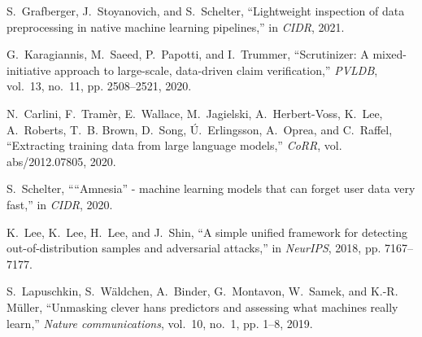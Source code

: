 \documentclass[11pt,dvipsnames]{article}
\begin{document}
\begin{thebibliography}{10}
S.~Grafberger, J.~Stoyanovich, and S.~Schelter, ``Lightweight inspection of
  data preprocessing in native machine learning pipelines,'' in \emph{CIDR},
  2021.

G.~Karagiannis, M.~Saeed, P.~Papotti, and I.~Trummer, ``Scrutinizer: {A}
  mixed-initiative approach to large-scale, data-driven claim verification,''
  \emph{PVLDB}, vol.~13, no.~11, pp. 2508--2521, 2020.

N.~Carlini, F.~Tram{\`{e}}r, E.~Wallace, M.~Jagielski, A.~Herbert{-}Voss,
  K.~Lee, A.~Roberts, T.~B. Brown, D.~Song, {\'{U}}.~Erlingsson, A.~Oprea, and
  C.~Raffel, ``Extracting training data from large language models,''
  \emph{CoRR}, vol. abs/2012.07805, 2020.

S.~Schelter, ````{A}mnesia'' - machine learning models that can forget user data
  very fast,'' in \emph{CIDR}, 2020.

K.~Lee, K.~Lee, H.~Lee, and J.~Shin, ``A simple unified framework for detecting
  out-of-distribution samples and adversarial attacks,'' in \emph{NeurIPS},
  2018, pp. 7167--7177.

S.~Lapuschkin, S.~W{\"a}ldchen, A.~Binder, G.~Montavon, W.~Samek, and K.-R.
  M{\"u}ller, ``Unmasking clever hans predictors and assessing what machines
  really learn,'' \emph{Nature communications}, vol.~10, no.~1, pp. 1--8, 2019.

\end{thebibliography}
\end{document}
